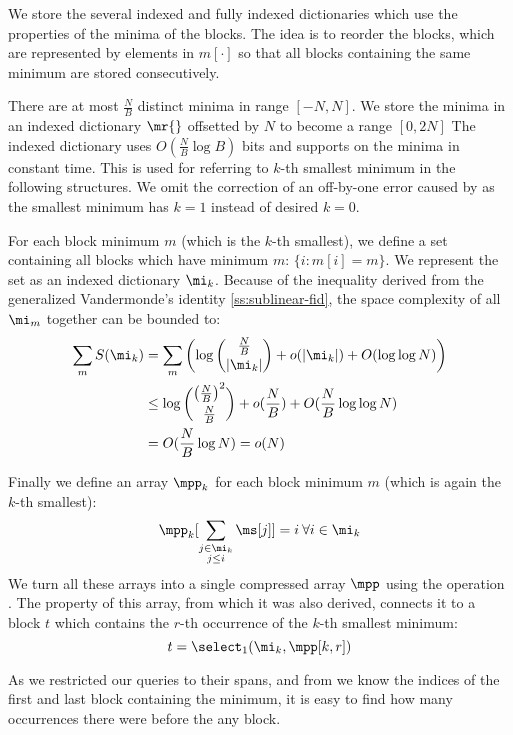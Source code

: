 We store the several indexed and fully indexed dictionaries which use the properties of the minima of the blocks.
The idea is to reorder the blocks, which are represented by elements in $m[\cdot]$ so that all blocks containing the same minimum are stored consecutively. 

There are at most $\frac{N}{B}$ distinct minima in range $[-N, N]$.
We store the minima in an indexed dictionary $\mr{}$ offsetted by $N$ to become a range $[0, 2 N]$
The indexed dictionary uses $O(\frac{N}{B} \log B)$ bits and supports \rank{} on the minima in constant time.
This is used for referring to $k$-th smallest minimum in the following structures.
We omit the correction of an off-by-one error caused by \rank{} as the smallest minimum has $k = 1$ instead of desired $k = 0$.

For each block minimum $m$ (which is the $k$-th smallest), we define a set containing all blocks which have minimum $m$: $\{ i : m[i] = m\}$.
We represent the set as an indexed dictionary $\mi_k$.
Because of the inequality derived from the generalized Vandermonde's identity \ref{ss:sublinear-fid}, the space complexity of all $\mi_m$ together can be bounded to:
\begin{align*}
	\sum_m S(\mi_k) &= \sum_m \left( \log {\frac{N}{B} \choose |\mi_k|} + o(|\mi_k|) + O(\log \log N) \right) \\
	&\le \log {\left(\frac{N}{B}\right)^2 \choose \frac{N}{B}} + o(\frac{N}{B}) + O(\frac{N}{B} \log \log N) \\
	&= O(\frac{N}{B} \log N) = o(N)
\end{align*}

Finally we define an array $\mpp_k$ for each block minimum $m$ (which is again the $k$-th smallest):
$$\mpp_k[\sum_{\substack{j \in \mi_k \\ j \le i}} \ms[j] ] = i \:\forall i \in \mi_k$$
We turn all these arrays into a single compressed array $\mpp$ using the operation \succ{}.
The property of this array, from which it was also derived, connects it to a block $t$ which contains the $r$-th occurrence of the $k$-th smallest minimum:
$$ t = \select_1(\mi_k, \mpp[k, r]) $$

\bigbreak

As we restricted our queries to their spans, and from \rmqiSpan{} we know the indices of the first and last block containing the minimum, it is easy to find how many occurrences there were before the any block.

